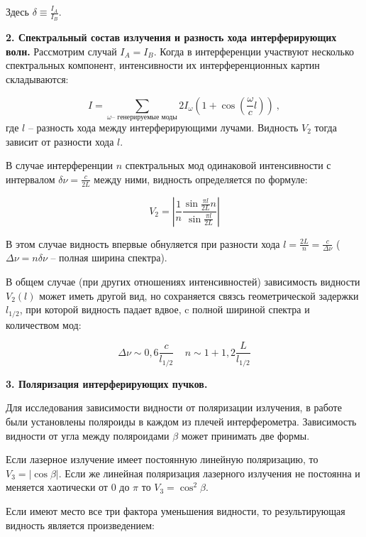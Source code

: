 \documentclass[a4paper,12pt]{article} %
\begin{document}
Здесь $\delta \equiv \frac{I_A}{I_B}$.

\textbf{2. Спектральный состав излучения и разность хода интерферирующих волн.}
Рассмотрим случай $I_A = I_B$. Когда в интерференции участвуют несколько спектральных компонент, интенсивности их интерференционных картин складываются:

\begin{equation}
    I = \sum_{\omega \text{-- генерируемые моды}} 2 I_\omega (1 + \cos(\frac{\omega}{c}l)) ~,
\end{equation}
где $l$ -- разность хода между интерферирующими лучами. Видность $V_2$ тогда зависит от разности хода $l$.

В случае интерференции $n$ спектральных мод одинаковой интенсивности с интервалом $\delta \nu = \frac{c}{2 L}$ между ними, видность определяется по формуле:

\begin{equation}
    V_2 = \left|\frac{1}{n} \frac{\sin \frac{\pi l}{2 L}n}{\sin\frac{\pi l}{2 L}}\right|
\end{equation}

В этом случае видность впервые обнуляется при разности хода $l = \frac{2 L}{n} = \frac{c}{\Delta \nu}$ ($\Delta \nu = n \delta \nu$ -- полная ширина спектра).

В общем случае (при других отношениях интенсивностей) зависимость видности $V_2(l)$ может иметь другой вид, но сохраняется связсь геометрической задержки $l_{1/2}$, при которой видность падает вдвое, c полной шириной спектра и количеством мод:

\begin{equation}
    \label{eq:assess}
    \boxed{
    \Delta \nu \sim 0,6 \frac{c}{l_{1/2}} ~~~~~ n \sim 1 + 1,2 \frac{L}{l_{1/2}}}
\end{equation}

\textbf{3. Поляризация интерферирующих пучков.}

Для исследования зависимости видности от поляризации излучения, в работе были установлены поляроиды в каждом из плечей интерферометра. Зависимость видности от угла между поляроидами $\beta$ может принимать две формы. 

Если лазерное излучение имеет постоянную линейную поляризацию, то $V_3 = |\cos \beta|$. Если же линейная поляризация лазерного излучения не постоянна и меняется хаотически от 0 до $\pi$ то $V_3 = \cos^2 \beta$.

Если имеют место все три фактора уменьшения видности, то результирующая видность является произведением:
\end{document}
